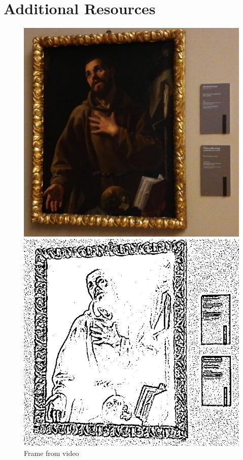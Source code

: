 \section*{Additional Resources}
\begin{figure}[h]
    \centering
        \includegraphics[width=\linewidth]{pictures/painting_detection/Frame.png}
        \caption*{Frame from video}\label{fig:Frame}
      \endminipage\hfill
        \includegraphics[width=\linewidth]{pictures/painting_detection/2-adaptive_threshold.PNG}

\end{figure}
